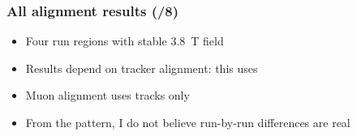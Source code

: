 \documentclass[compress]{beamer}
\begin{document}
\begin{frame}
\frametitle{All alignment results (/8)}

\vfill
\begin{itemize}
\item Four run regions with stable 3.8~T field
\item Results depend on tracker alignment: this uses 
\item Muon alignment uses tracks only 
\item From the pattern, I do not believe run-by-run differences are real
\end{itemize}


\end{frame}
\end{document}
